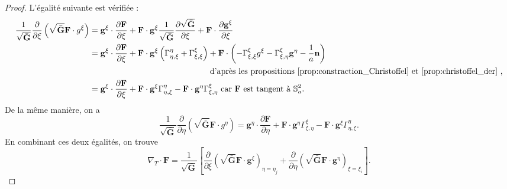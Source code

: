 \begin{proof}
L'égalité suivante est vérifiée :
\begin{align*}
\dfrac{1}{\sqrt{\bar{\mathbf{G}}}} \dfrac{\partial}{\partial \xi} \left( \sqrt{\bar{\mathbf{G}}} \mathbf{F} \cdot g^{\xi} \right) & = \mathbf{g}^{\xi} \cdot \dfrac{\partial \mathbf{F}}{\partial \xi} + \mathbf{F} \cdot \mathbf{g}^{\xi} \dfrac{1}{\sqrt{\bar{\mathbf{G}}}} \dfrac{\partial \sqrt{\bar{\mathbf{G}}}}{\partial \xi} + \mathbf{F} \cdot \dfrac{\partial \mathbf{g}^{\xi}}{\partial \xi} \\
	& = \mathbf{g}^{\xi} \cdot \dfrac{\partial \mathbf{F}}{\partial \xi} + \mathbf{F} \cdot \mathbf{g}^{\xi} \left( \Gamma_{\eta,\xi}^{\eta} + \Gamma_{\xi,\xi}^{\xi} \right) + \mathbf{F} \cdot \left( - \Gamma_{\xi,\xi}^{\xi} g^{\xi} - \Gamma_{\xi,\eta}^{\xi} \mathbf{g}^{\eta} - \dfrac{1}{a} \mathbf{n} \right) \\
	& \hspace{5cm} \text{ d'après les propositions \ref{prop:constraction_Christoffel} et \ref{prop:christoffel_der} ,} \\
		& = \mathbf{g}^{\xi} \cdot \dfrac{\partial \mathbf{F}}{\partial \xi} + \mathbf{F} \cdot \mathbf{g}^{\xi} \Gamma_{\eta,\xi}^{\eta} - \mathbf{F} \cdot \mathbf{g}^{\eta} \Gamma_{\xi,\eta}^{\xi} \text{ car } \mathbf{F} \text{ est tangent à } \mathbb{S}_a^2.
\end{align*}
De la même manière, on a
\begin{equation}
\dfrac{1}{\sqrt{\bar{\mathbf{G}}}} \dfrac{\partial}{\partial \eta} \left( \sqrt{\bar{\mathbf{G}}} \mathbf{F} \cdot g^{\eta} \right) = \mathbf{g}^{\eta} \cdot \dfrac{\partial \mathbf{F}}{\partial \eta} + \mathbf{F} \cdot \mathbf{g}^{\eta} \Gamma_{\xi,\eta}^{\xi} - \mathbf{F} \cdot \mathbf{g}^{\xi} \Gamma_{\eta,\xi}^{\eta}.
\end{equation}
En combinant ces deux égalités, on trouve
\begin{equation}
\nabla_T \cdot \mathbf{F} = \dfrac{1}{\sqrt{\bar{\mathbf{G}}}} \left[ \dfrac{\partial}{\partial \xi} \left( \sqrt{\bar{\mathbf{G}}} \mathbf{F} \cdot \mathbf{g}^{\xi} \right)_{\eta = \eta_j} + 
\dfrac{\partial}{\partial \eta} \left( \sqrt{\bar{\mathbf{G}}} \mathbf{F} \cdot \mathbf{g}^{\eta} \right)_{\xi = \xi_i}
\right].
\end{equation}
\end{proof}

